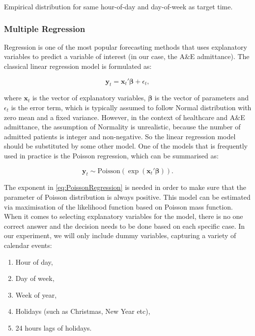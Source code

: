 \documentclass[]{elsarticle} %
\providecommand{\tightlist}{%
  \setlength{\itemsep}{0pt}\setlength{\parskip}{0pt}}
\begin{document}
Empirical distribution for same hour-of-day and day-of-week as target time.

\hypertarget{multiple-regression}{%
\subsubsection{Multiple Regression}\label{multiple-regression}}

Regression is one of the most popular forecasting methods that uses explanatory variables to predict a variable of interest (in our case, the A\&E admittance). The classical linear regression model is formulated as:

\begin{equation}
  \mathbf{y}_t = \mathbf{x}_t' \boldsymbol{\beta} + \epsilon_t ,
\label{eq:linearRegression}
\end{equation}

where \(\mathbf{x}_t\) is the vector of explanatory variables, \(\boldsymbol{\beta}\) is the vector of parameters and \(\epsilon_t\) is the error term, which is typically assumed to follow Normal distribution with zero mean and a fixed variance. However, in the context of healthcare and A\&E admittance, the assumption of Normality is unrealistic, because the number of admitted patients is integer and non-negative. So the linear regression model should be substituted by some other model. One of the models that is frequently used in practice is the Poisson regression, which can be summarised as:

\begin{equation}
  \mathbf{y}_t \sim \mathrm{Poisson} \left( \exp \left( \mathbf{x}_t' \boldsymbol{\beta} \right) \right).
\label{eq:PoissonRegression}
\end{equation}

The exponent in \eqref{eq:PoissonRegression} is needed in order to make sure that the parameter of Poisson distribution is always positive. This model can be estimated via maximisation of the likelihood function based on Poisson mass function. When it comes to selecting explanatory variables for the model, there is no one correct answer and the decision needs to be done based on each specific case. In our experiment, we will only include dummy variables, capturing a variety of calendar events:

\begin{enumerate}
\def\labelenumi{\arabic{enumi}.}
\tightlist
\item
  Hour of day,
\item
  Day of week,
\item
  Week of year,
\item
  Holidays (such as Christmas, New Year etc),
\item
  24 hours lags of holidays.
\end{enumerate}
\end{document}
